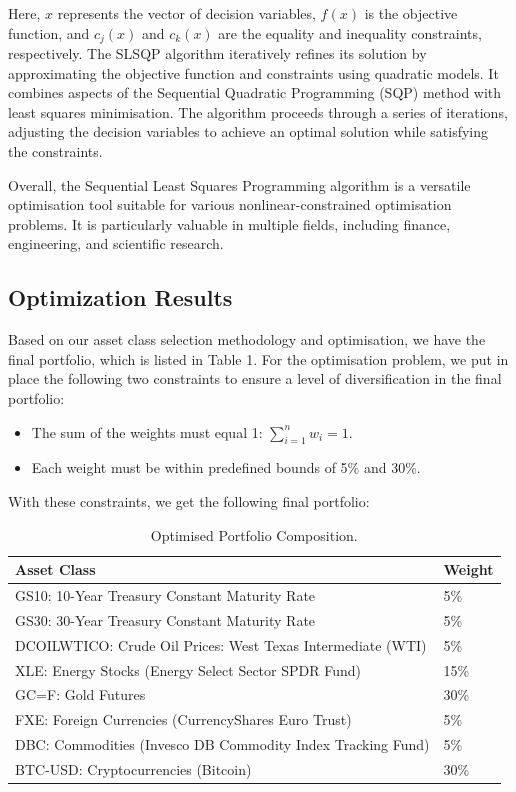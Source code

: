 \documentclass{article}
\begin{document}
Here, \( x \) represents the vector of decision variables, \( f(x) \) is the objective function, and \( c_j(x) \) and \( c_k(x) \) are the equality and inequality constraints, respectively.
The SLSQP algorithm iteratively refines its solution by approximating the objective function and constraints using quadratic models. It combines aspects of the Sequential Quadratic Programming (SQP) method with least squares minimisation. The algorithm proceeds through a series of iterations, adjusting the decision variables to achieve an optimal solution while satisfying the constraints.

Overall, the Sequential Least Squares Programming algorithm is a versatile optimisation tool suitable for various nonlinear-constrained optimisation problems. It is particularly valuable in multiple fields, including finance, engineering, and scientific research.


\subsection{Optimization Results}

Based on our asset class selection methodology and optimisation, we have the final portfolio, which is listed in Table 1. For the optimisation problem, we put in place the following two constraints to ensure a level of diversification in the final portfolio:

\begin{itemize}
    \item The sum of the weights must equal 1: \( \sum_{i=1}^{n} w_i = 1 \).
    \item Each weight must be within predefined bounds of 5\% and 30\%.
\end{itemize}

With these constraints, we get the following final portfolio:

\begin{table}[H]
\centering
\begin{tabular}{ | m{7cm} | m{4cm} | }
 \hline
 \textbf{Asset Class} & \textbf{Weight} \\
 \hline
 GS10: 10-Year Treasury Constant Maturity Rate & 5\% \\ 
 \hline
 GS30: 30-Year Treasury Constant Maturity Rate & 5\% \\
 \hline
 DCOILWTICO: Crude Oil Prices: West Texas Intermediate (WTI) & 5\% \\ 
 \hline
 XLE: Energy Stocks (Energy Select Sector SPDR Fund) & 15\% \\ 
 \hline
 GC=F: Gold Futures & 30\% \\ 
 \hline
 FXE: Foreign Currencies (CurrencyShares Euro Trust) & 5\% \\
 \hline
 DBC: Commodities (Invesco DB Commodity Index Tracking Fund) & 5\% \\ 
 \hline
 BTC-USD: Cryptocurrencies (Bitcoin) & 30\% \\ 
 \hline
\end{tabular}
 \label{table:tab1}
 \caption{Optimised Portfolio Composition.}
\end{table}
\end{document}
